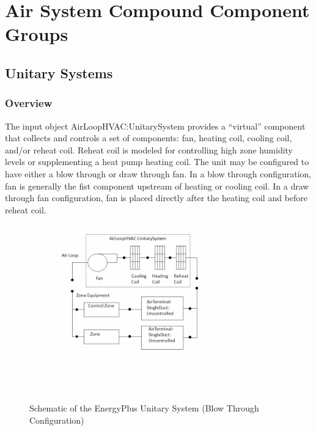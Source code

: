 \section{Air System Compound Component Groups }\label{air-system-compound-component-groups}

\subsection{Unitary Systems}\label{unitary-systems}

\subsubsection{Overview}\label{overview-000}

The input object AirLoopHVAC:UnitarySystem provides a ``virtual'' component that collects and controls a set of components: fan, heating coil, cooling coil, and/or reheat coil. Reheat coil is modeled for controlling high zone humidity levels or supplementing a heat pump heating coil. The unit may be configured to have either a blow through or draw through fan. In a blow through configuration, fan is generally the fist component upstream of heating or cooling coil. In a draw through fan configuration, fan is placed directly after the heating coil and before reheat coil.

\begin{figure}[hbtp] %
\centering
\includegraphics[width=0.9\textwidth, height=0.9\textheight, keepaspectratio=true]{media/image4930.png}
\caption{Schematic of the EnergyPlus Unitary System (Blow Through Configuration) \protect \label{fig:schematic-of-the-energyplus-unitary-system}}
\end{figure}

